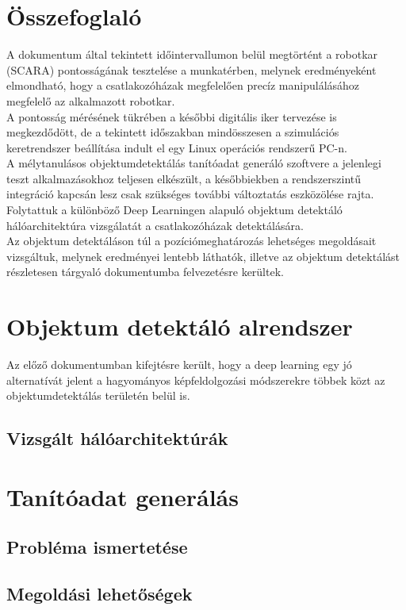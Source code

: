 \documentclass{article}
\begin{document}
\section{Összefoglaló}
A dokumentum által tekintett időintervallumon belül megtörtént a robotkar (SCARA)
pontosságának tesztelése a munkatérben, melynek eredményeként elmondható, hogy 
a csatlakozóházak megfelelően precíz manipulálásához megfelelő az alkalmazott robotkar.\\[5pt]
A pontosság mérésének tükrében a későbbi digitális iker tervezése is megkezdődött, de 
a tekintett időszakban mindösszesen a szimulációs keretrendszer beállítása indult el 
egy Linux operációs rendszerű PC-n.\\[5pt]
A mélytanulásos objektumdetektálás tanítóadat generáló szoftvere a jelenlegi teszt 
alkalmazásokhoz teljesen elkészült, a későbbiekben a rendszerszintű integráció 
kapcsán lesz csak szükséges további változtatás eszközölése rajta.\\[5pt]
Folytattuk a különböző Deep Learningen alapuló objektum detektáló hálóarchitektúra 
vizsgálatát a csatlakozóházak detektálására.\\[5pt]
Az objektum detektáláson túl a pozíciómeghatározás lehetséges megoldásait vizsgáltuk,
melynek eredményei lentebb láthatók, illetve az objektum detektálást részletesen tárgyaló
dokumentumba felvezetésre kerültek.


\section{Objektum detektáló alrendszer}
Az előző dokumentumban kifejtésre került, hogy a deep learning egy jó alternatívát jelent a hagyományos képfeldolgozási 
módszerekre többek közt az objektumdetektálás területén belül is. 

\subsection{Vizsgált hálóarchitektúrák}

\section{Tanítóadat generálás}
\subsection{Probléma ismertetése}

\subsection{Megoldási lehetőségek}
\end{document}
